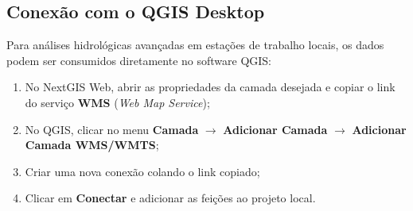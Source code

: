 \subsection{Conexão com o QGIS Desktop}
Para análises hidrológicas avançadas em estações de trabalho locais, os dados podem ser consumidos diretamente no software QGIS:
\begin{enumerate}
    \item No NextGIS Web, abrir as propriedades da camada desejada e copiar o link do serviço \textbf{WMS} (\textit{Web Map Service});
    \item No QGIS, clicar no menu \textbf{Camada} $\rightarrow$ \textbf{Adicionar Camada} $\rightarrow$ \textbf{Adicionar Camada WMS/WMTS};
    \item Criar uma nova conexão colando o link copiado;
    \item Clicar em \textbf{Conectar} e adicionar as feições ao projeto local.
\end{enumerate}

